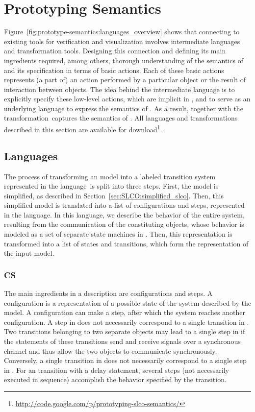 \section{Prototyping Semantics}
\label{sec:prototype-semantics:prototyping_semantics}
Figure~\ref{fig:prototype-semantics:languages_overview} shows that connecting \SLCO to existing tools for verification and visualization involves intermediate languages and transformation tools.
Designing this connection and defining its main ingredients required, among others, thorough understanding of the semantics of \SLCO and its specification in terms of basic actions.
Each of these basic actions represents (a part of) an action performed by a particular object or the result of interaction between objects.
The idea behind the intermediate language \CS is to explicitly specify these low-level actions, which are implicit in \SLCO, and to serve as an underlying language to express the semantics of \SLCO.
As a result, \CS together with the transformation~\SLCOtoCS captures the semantics of \SLCO.
All languages and transformations described in this section are available for download\footnote{\url{http://code.google.com/p/prototyping-slco-semantics/}}.

\subsection{Languages}
\label{sec:prototype-semantics:languages}
The process of transforming an \SLCO model into a labeled transition system represented in the language~\LTS is split into three steps.
First, the \SLCO model is simplified, as described in Section~\ref{sec:SLCO:simplified_slco}.
Then, this simplified \SLCO model is translated into a list of configurations and steps, represented in the \CS language.
In this language, we describe the behavior of the entire system, resulting from the communication of the constituting objects, whose behavior is modeled as a set of separate state machines in \SLCO.
Then, this \CS representation is transformed into a list of states and transitions, which form the \LTS representation of the input model.

\subsubsection{CS}
\label{subsucsec:prototype-semantics:cs}
The main ingredients in a \CS description are configurations and steps.
A configuration is a representation of a possible state of the system described by the \SLCO model.
A configuration can make a step, after which the system reaches another configuration.
A step in \CS does not necessarily correspond to a single transition in \SLCO.
Two transitions belonging to two separate objects may lead to a single step in \CS if the statements of these transitions send and receive signals over a synchronous channel and thus allow the two objects to communicate synchronously.
Conversely, a single transition in \SLCO does not necessarily correspond to a single step in \CS.
For an \SLCO transition with a delay statement, several steps (not necessarily executed in sequence) accomplish the behavior specified by the transition.

